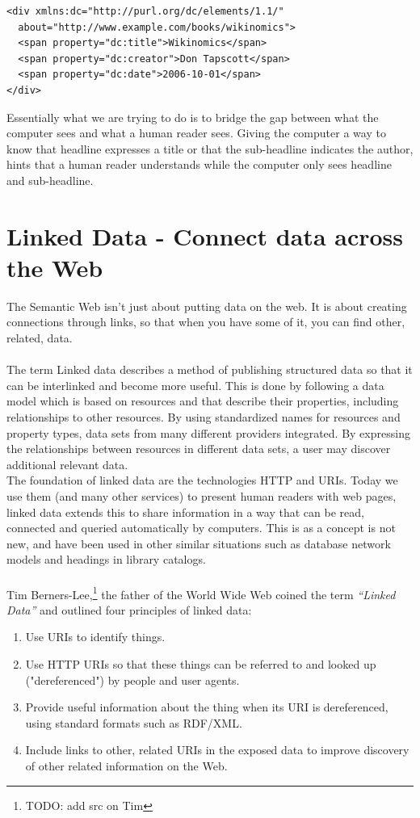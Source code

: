 \begin{verbatim}
<div xmlns:dc="http://purl.org/dc/elements/1.1/"
  about="http://www.example.com/books/wikinomics">
  <span property="dc:title">Wikinomics</span>
  <span property="dc:creator">Don Tapscott</span>
  <span property="dc:date">2006-10-01</span>
</div>
\end{verbatim}
\linebreak
\newline
Essentially what we are trying to do is to bridge the gap between what the computer sees and what a human reader sees. Giving the computer a way to know that headline expresses a title or that the sub-headline indicates the author, hints that a human reader understands while the computer only sees headline and sub-headline. 

\section{Linked Data - Connect data across the Web}
The Semantic Web isn't just about putting data on the web. It is about creating connections through links, so that when you have some of it, you can find other, related, data.\\\\
The term Linked data describes a method of publishing structured data so that it can be interlinked and become more useful. This is done by following a data model which is based on resources and that describe their properties, including relationships to other resources. By using standardized names for resources and property types, data sets from many different providers integrated. By expressing the relationships between resources in different data sets, a user may discover additional relevant data.\\
The foundation of linked data are the technologies HTTP and URIs. Today we use them (and many other services) to present human readers with web pages, linked data extends this to share information in a way that can be read, connected and queried automatically by computers. This is as a concept is not new, and have been used in other similar situations such as database network models and headings in library catalogs.\\\\
Tim Berners-Lee,\footnote{TODO: add src on Tim} the father of the World Wide Web coined the term \textit{“Linked Data”} and outlined four principles of linked data:
\begin{enumerate}
\item{Use URIs to identify things.}
\item{Use HTTP URIs so that these things can be referred to and looked up ("dereferenced") by people and user agents.}
\item{Provide useful information about the thing when its URI is dereferenced, using standard formats such as RDF/XML.}
\item{Include links to other, related URIs in the exposed data to improve discovery of other related information on the Web.}
\end{enumerate}
